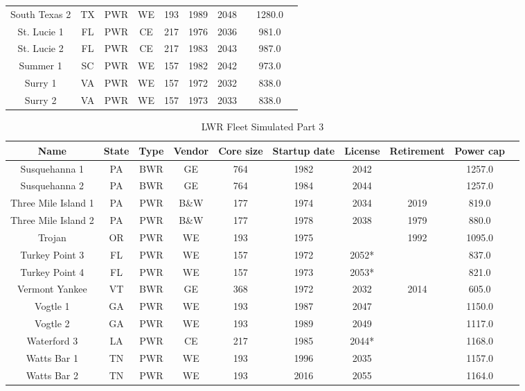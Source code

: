 \begin{table}
\begin{tabular}{c c c c c c c c c c}
    South Texas 2 & TX & PWR & WE & 193 & 1989 & 2048 &  & 1280.0 \\
    St. Lucie 1 & FL & PWR & CE & 217 & 1976 & 2036 &  & 981.0 \\
    St. Lucie 2 & FL & PWR & CE & 217 & 1983 & 2043 &  & 987.0 \\
    Summer 1 & SC & PWR & WE & 157 & 1982 & 2042 &  & 973.0 \\
    Surry 1 & VA & PWR & WE & 157 & 1972 & 2032 &  & 838.0 \\
    Surry 2 & VA & PWR & WE & 157 & 1973 & 2033 &  & 838.0 \\
    \hline
    \end{tabular}
\end{table}

\begin{table}
    \centering
    \caption{LWR Fleet Simulated Part 3}
    \label{tab:lwr_fleet3}
    \begin{tabular}{c c c c c c c c c c}
    \hline
    \textbf{Name} & \textbf{State} & \textbf{Type} & \textbf{Vendor} & \textbf{Core size} & \textbf{Startup date} & \textbf{License} & \textbf{Retirement} & \textbf{Power cap} \\
    \hline
    Susquehanna 1 & PA & BWR & GE & 764 & 1982 & 2042 &  & 1257.0 \\
    Susquehanna 2 & PA & BWR & GE & 764 & 1984 & 2044 &  & 1257.0 \\
    Three Mile Island 1 & PA & PWR & B\&W & 177 & 1974 & 2034 & 2019 & 819.0 \\
    Three Mile Island 2 & PA & PWR & B\&W & 177 & 1978 & 2038 & 1979 & 880.0 \\
    Trojan & OR & PWR & WE & 193 & 1975 &  & 1992 & 1095.0 \\
    Turkey Point 3 & FL & PWR & WE & 157 & 1972 & 2052* &  & 837.0 \\
    Turkey Point 4 & FL & PWR & WE & 157 & 1973 & 2053* &  & 821.0 \\
    Vermont Yankee & VT & BWR & GE & 368 & 1972 & 2032 & 2014 & 605.0 \\
    Vogtle 1 & GA & PWR & WE & 193 & 1987 & 2047 &  & 1150.0 \\
    Vogtle 2 & GA & PWR & WE & 193 & 1989 & 2049 &  & 1117.0 \\
    Waterford 3 & LA & PWR & CE & 217 & 1985 & 2044* &  & 1168.0 \\
    Watts Bar 1 & TN & PWR & WE & 193 & 1996 & 2035 &  & 1157.0 \\
    Watts Bar 2 & TN & PWR & WE & 193 & 2016 & 2055 &  & 1164.0 \\

\end{tabular}
\end{table}
